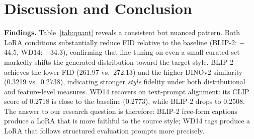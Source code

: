 \documentclass[10pt,twocolumn,letterpaper]{article}
\begin{document}
\begin{table}[H]
\centering
\caption{Fixed evaluation prompts used for all conditions.}
\label{tab:prompts}
\end{table}

\section{Discussion and Conclusion}

\noindent\textbf{Findings.}
Table~\ref{tab:quant} reveals a consistent but nuanced pattern.
Both LoRA conditions substantially reduce FID relative to the baseline (BLIP-2: $-$44.5, WD14: $-$34.3), confirming that fine-tuning on even a small curated set markedly shifts the generated distribution toward the target style.
BLIP-2 achieves the lower FID (261.97 vs.\ 272.13) and the higher DINOv2 similarity (0.3219 vs.\ 0.2738), indicating stronger \emph{style} fidelity under both distributional and feature-level measures.
WD14 recovers on text-prompt alignment: its CLIP score of 0.2718 is close to the baseline (0.2773), while BLIP-2 drops to 0.2508.
The answer to our research question is therefore: BLIP-2 free-form captions produce a LoRA that is more faithful to the source style; WD14 tags produce a LoRA that follows structured evaluation prompts more precisely.
\end{document}
